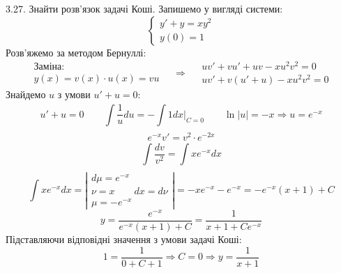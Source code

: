 \documentclass[14pt,a4paper]{scrartcl}
\theoremstyle{definition}
\theoremstyle{remark}
\theoremstyle{definition}
\theoremstyle{definition}
\begin{document}
\pagebreak

3.27. Знайти розв'язок задачі Коші. Запишемо у вигляді системи:
$$
\left\lbrace
\begin{gathered}
 y'  + y = xy^2\\
  y(0) = 1
\end{gathered} \right.
$$
Розв'яжемо за методом Бернуллі:
$$
\begin{gathered}
\text{Заміна:}\\
y(x) = v(x)\cdot u(x) = vu
\end{gathered}
\quad \Longrightarrow \quad
\begin{gathered}
 uv' + vu' + uv - xu^2v^2 = 0 \\
 uv' + v(u' + u) - xu^2v^2 = 0
\end{gathered}
$$
Знайдемо $u$ з умови $u' + u =0$:
$$
u' + u =0 \qquad  \int\limits_{}^{}{ \frac{1}{u} du}  =  -\int\limits_{}^{}{1 dx} \Big|_{C=0} \qquad \ln{ \left| u \right| } = -x \Longrightarrow u = e^{-x}
$$
$$
e^{-x}v' = v^2 \cdot e^{-2x}
$$
$$
 \int\limits_{}^{}{ \frac{dv}{v^2} } =  \int\limits_{}^{}{ x e^{-x}dx }
$$
$$
\int\limits_{}^{}{ x e^{-x}dx } = \left| \begin{gathered}
 d\mu =  e^{-x} \\
 \nu = x \qquad dx = d\nu\\
 \mu =  - e^{-x}
\end{gathered} \right| = -xe^{-x} -e^{-x} = -e^{-x} (x+1) + C
$$
$$
y = \frac{e^{-x}}{ e^{-x} (x+1) +C} = \frac{1}{x+1 + Ce^{-x}}
$$
Підставляючи відповідні значення з умови задачі Коші:
$$
1 = \frac{1}{ 0 + C + 1}  \Longrightarrow  C = 0 \Longrightarrow y = \frac{1}{x+1}
$$

\pagebreak
\end{document}
